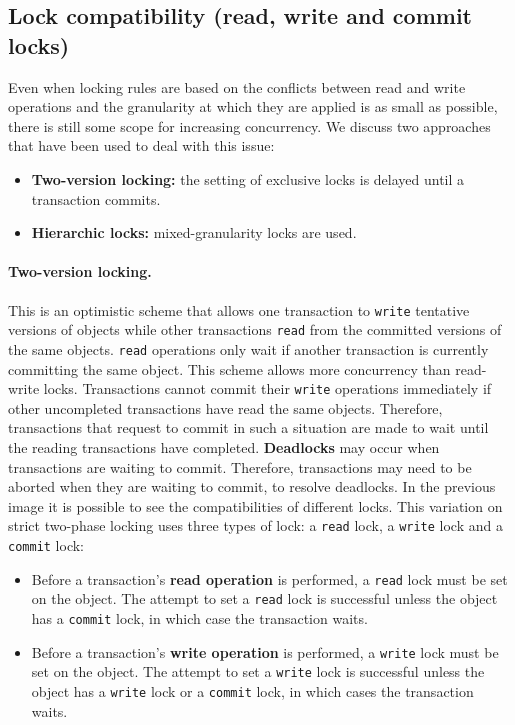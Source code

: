 \subsection{Lock compatibility (read, write and commit locks)}
Even when locking rules are based on the conflicts between read and write operations and the granularity at which they are applied is as small as possible, there is still some scope for increasing concurrency. We discuss two approaches that have been used to deal with this issue:
\begin{itemize}
	\item \textbf{Two-version locking:} the setting of exclusive locks is delayed until a transaction commits.
	\item \textbf{Hierarchic locks:} mixed-granularity locks are used.
\end{itemize}

\paragraph*{Two-version locking.} This is an optimistic scheme that allows one transaction to \verb|write| tentative versions of objects while other transactions \verb|read| from the committed versions of the same objects. \verb|read| operations only wait if another transaction is currently committing the same object. This scheme allows more concurrency than read-write locks. Transactions cannot commit their \verb|write| operations immediately if other uncompleted transactions have read the same objects. Therefore, transactions that request to commit in such a situation are made to wait until the reading transactions have completed. \textbf{Deadlocks} may occur when transactions are waiting to commit. Therefore, transactions may need to be aborted when they are waiting to commit, to resolve deadlocks.
In the previous image it is possible to see the compatibilities of different locks. This variation on strict two-phase locking uses three types of lock: a \verb|read| lock, a \verb|write| lock and a \verb|commit| lock:
\begin{itemize}
	\item Before a transaction’s \textbf{read operation} is performed, a \verb|read| lock must be set on the object. The attempt to set a \verb|read| lock is successful unless the object has a \verb|commit| lock, in which case the transaction waits.
	\item Before a transaction’s \textbf{write operation} is performed, a \verb|write| lock must be set on the object. The attempt to set a \verb|write| lock is successful unless the object has a \verb|write| lock or a \verb|commit| lock, in which cases the transaction waits.
\end{itemize}

